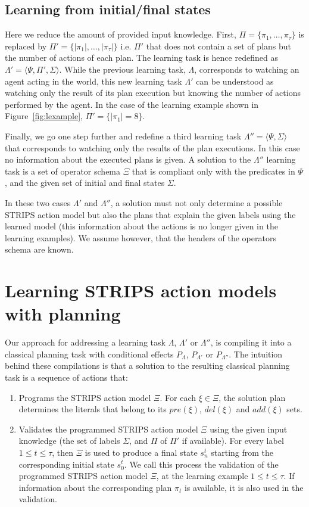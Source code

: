\documentclass[letterpaper]{article} %
\newcommand{\tup}[1]{{\langle #1 \rangle}}
\begin{document}
\subsection{Learning from initial/final states}
Here we reduce the amount of provided input knowledge. First, $\Pi=\{\pi_1,\ldots,\pi_{\tau}\}$ is replaced by $\Pi'=\{|\pi_1|,\ldots,|\pi_{\tau}|\}$ i.e. $\Pi'$ that does not contain a set of plans but the number of actions of each plan. The learning task is hence redefined as $\Lambda'=\tup{\Psi,\Pi',\Sigma}$. While the previous learning task, $\Lambda$, corresponds to watching an agent acting in the world, this new learning task $\Lambda'$ can be understood as watching only the result of its plan execution but knowing the number of actions performed by the agent. In the case of the learning example shown in Figure~\ref{fig:lexample}, $\Pi'=\{|\pi_1|=8\}$. 

Finally, we go one step further and redefine a third learning task $\Lambda''=\tup{\Psi,\Sigma}$ that corresponds to watching only the results of the plan executions. In this case no information about the executed plans is given. A solution to the $\Lambda''$ learning task is a set of operator schema $\Xi$ that is compliant only with the predicates in $\Psi$, and the given set of initial and final states $\Sigma$.

In these two cases $\Lambda'$ and $\Lambda''$, a solution must not only determine a possible STRIPS action model but also the plans that explain the given labels using the learned model (this information about the actions is no longer given in the learning examples). We assume however, that the headers of the operators schema are known. 


\section{Learning STRIPS action models with planning}
Our approach for addressing a learning task $\Lambda$, $\Lambda'$ or $\Lambda''$, is compiling it into a classical planning task with conditional effects $P_{\Lambda}$, $P_{\Lambda'}$ or $P_{\Lambda''}$. The intuition behind these compilations is that a solution to the resulting classical planning task is a sequence of actions that:
\begin{enumerate}
\item Programs the STRIPS action model $\Xi$. For each $\xi\in\Xi$, the solution plan determines the literals that belong to its $pre(\xi)$, $del(\xi)$ and $add(\xi)$ sets.
\item Validates the programmed STRIPS action model $\Xi$ using the given input knowledge (the set of labels $\Sigma$, and $\Pi$ of $\Pi'$ if available).  For every label {\small $1\leq t\leq \tau$}, then $\Xi$ is used to produce a final state $s_{n}^t$ starting from the corresponding initial state $s_0^t$. We call this process the validation of the programmed STRIPS action model $\Xi$, at the learning example {\small $1\leq t\leq \tau$}. If information about the corresponding plan $\pi_t$ is available, it is also used in the validation.
\end{enumerate}
\end{document}

